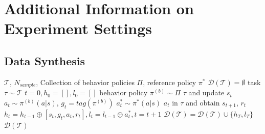 \documentclass{article}
\begin{document}
\section{Additional Information on Experiment Settings}
\subsection{Data Synthesis} \label{sec:anymdp_synthesis}

\begin{algorithm}[htbp]
   \caption{Data Synthesis Pipeline}
   \label{alg:data_synthesis}
    \begin{algorithmic}
        $\mathcal{T}$, $N_{sample}$, Collection of behavior policies $\Pi$, reference policy $\pi^{*}$
        $\mathcal{D}(\mathcal{T})=\emptyset$
       \FOR{$[1,N_{sample}]$}
             task $\tau \sim \mathcal{T}$
             $t=0, h_0=[], l_0=[]$ 
            \REPEAT
                 behavior policy $\pi^{(b)} \sim \Pi$
                 $\tau$ and update $s_t$
                \REPEAT
                      $a_t \sim \pi^{(b)}(a|s)$, $g_t=tag(\pi^{(b)})$
                     $a^*_t \sim \pi^*(a|s)$
                     $a_t$ in $\tau$ and obtain $s_{t+1}$, $r_t$
                     $h_{t}=h_{t-1}\oplus[s_t, g_t, a_t, r_t], l_{t} = l_{t-1}\oplus a^*_t, t=t+1$
             $\mathcal{D}(\mathcal{T})=\mathcal{D}(\mathcal{T}) \cup \{h_T, l_T\}$
       \ENDFOR
         $\mathcal{D}(\mathcal{T})$
    \end{algorithmic}
\end{algorithm}
\end{document}
